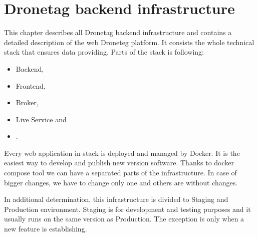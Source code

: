 \chapter{Dronetag backend infrastructure}\label{ch:dronetag-backend-infrastructure}
This chapter describes all Dronetag backend infrastructure and contains a detailed description of the web Droneteg platform.
It consists the whole technical stack that ensures data providing.
Parts of the stack is following:
\begin{itemize}
    \item Backend,
    \item Frontend,
    \item Broker,
    \item Live Service and
    \item .
\end{itemize}
Every web application in stack is deployed and managed by Docker. %
It is the easiest way to develop and publish new version software.
Thanks to docker compose tool we can have a separated parts of the infrastructure.
In case of bigger changes, we have to change only one and others are without changes.

In additional determination, this infrastructure is divided to Staging and Production environment.
Staging is for development and testing purposes and it usually runs on the same version as Production.
The exception is only when a new feature is establishing.






